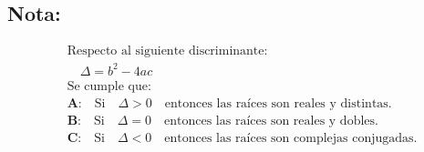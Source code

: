 \documentclass[a4paper,12pt,numbers=noenddot]{scrreprt}
\begin{document}
\subsection*{Nota:}
\begin{align*}
    &\text{Respecto al siguiente discriminante:}\\
    &\quad \Delta = b^2 - 4ac\\
    &\text{Se cumple que:}\\
    &\textbf{A:} \quad \text{Si} \quad \Delta > 0 \quad \text{entonces las raíces son reales y distintas.}\\
    &\textbf{B:} \quad \text{Si} \quad \Delta = 0 \quad \text{entonces las raíces son reales y dobles.}\\
    &\textbf{C:} \quad \text{Si} \quad \Delta < 0 \quad \text{entonces las raíces son complejas conjugadas.}
\end{align*}
        
\end{document}
